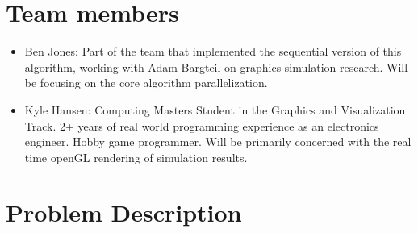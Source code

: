 \documentclass[cameraready]{acmsiggraph-awb}
\title{\theTitle}
\author{
	Ben Jones \and Kyle Hansen}
\begin{document}

\maketitle




\section{Team members}

\begin{itemize}

\item Ben Jones: Part of the team that implemented the sequential version of this algorithm, working with Adam Bargteil on graphics simulation research.
Will be focusing on the core algorithm parallelization.

\item Kyle Hansen: Computing Masters Student in the Graphics and Visualization Track.  
2+ years of real world programming experience as an electronics engineer.  
Hobby game programmer.  
Will be primarily concerned with the real time openGL rendering of simulation results.

\end{itemize}

\section{Problem Description}
\end{document}
